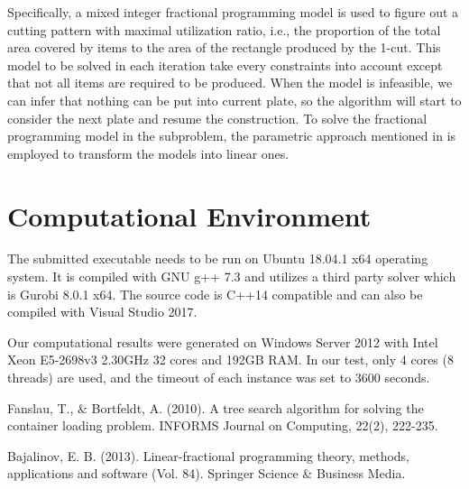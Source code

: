 \documentclass{article}
\begin{document}
		Specifically, a mixed integer fractional programming model is used to figure out a cutting pattern with maximal utilization ratio, i.e., the proportion of the total area covered by items to the area of the rectangle produced by the 1-cut.
		This model to be solved in each iteration take every constraints into account except that not all items are required to be produced.
		When the model is infeasible, we can infer that nothing can be put into current plate, so the algorithm will start to consider the next plate and resume the construction.
		To solve the fractional programming model in the subproblem, the parametric approach mentioned in \cite{bajalinov2013linear} is employed to transform the models into linear ones.
		
	
	\section{Computational Environment}
		
		The submitted executable needs to be run on Ubuntu 18.04.1 x64 operating system.
		It is compiled with GNU g++ 7.3 and utilizes a third party solver which is Gurobi 8.0.1 x64.
		The source code is C++14 compatible and can also be compiled with Visual Studio 2017.
		
		Our computational results were generated on Windows Server 2012 with Intel Xeon E5-2698v3 2.30GHz 32 cores and 192GB RAM.
		In our test, only 4 cores (8 threads) are used, and the timeout of each instance was set to 3600 seconds.
	
	
	\begin{thebibliography}{9}
		Fanslau, T., \& Bortfeldt, A. (2010). A tree search algorithm for solving the container loading problem. INFORMS Journal on Computing, 22(2), 222-235.
		
		Bajalinov, E. B. (2013). Linear-fractional programming theory, methods, applications and software (Vol. 84). Springer Science \& Business Media.
		
	\end{thebibliography}
	
\end{document}
